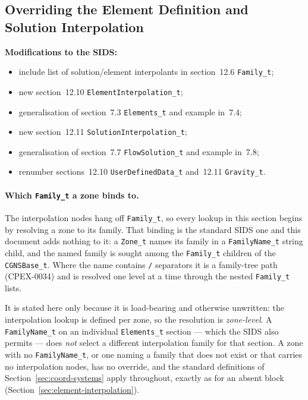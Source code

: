 \documentclass[11pt,letterpaper]{article}
\newenvironment{v2quote}
  {\begin{v2quoteframe}%
   \noindent{\footnotesize\sffamily\bfseries\color{cgnsblue}v2 text}%
   \nopagebreak\par\nopagebreak\vspace{0.15em}}
  {\end{v2quoteframe}}
\newif\ifvfourdraft
\newcommand{\vfourmark}{\ifvfourdraft\textcolor{v4violet}{\textbf{[v4]}}\ \fi}
\begin{document}
\subsection{Overriding the Element Definition and Solution Interpolation}
\label{sec:override}

\begin{v2quote}
\textbf{Modifications to the SIDS:}
\begin{itemize}
  \item include list of solution/element interpolants in section~12.6 \texttt{Family\_t};
  \item new section~12.10 \texttt{ElementInterpolation\_t};
  \item generalisation of section~7.3 \texttt{Elements\_t} and example in~7.4;
  \item new section~12.11 \texttt{SolutionInterpolation\_t};
  \item generalisation of section~7.7 \texttt{FlowSolution\_t} and example in~7.8;
  \item renumber sections~12.10 \texttt{UserDefinedData\_t} and~12.11 \texttt{Gravity\_t}.
\end{itemize}
\end{v2quote}

\paragraph{\vfourmark Which \texttt{Family\_t} a zone binds to.}
The interpolation nodes hang off \texttt{Family\_t}, so every lookup in this
section begins by resolving a zone to its family.  That binding is the standard
SIDS one and this document adds nothing to it: a \texttt{Zone\_t} names its family
in a \texttt{FamilyName\_t} string child, and the named family is sought among the
\texttt{Family\_t} children of the \texttt{CGNSBase\_t}.  Where the name contains
\texttt{/} separators it is a family-tree path (CPEX-0034) and is resolved one
level at a time through the nested \texttt{Family\_t} lists.

It is stated here only because it is load-bearing and otherwise unwritten: the
interpolation lookup is defined per zone, so the resolution is
\emph{zone-level}.  A \texttt{FamilyName\_t} on an individual \texttt{Elements\_t}
section --- which the SIDS also permits --- does \emph{not} select a different
interpolation family for that section.  A zone with no \texttt{FamilyName\_t}, or
one naming a family that does not exist or that carries no interpolation nodes,
has no override, and the standard definitions of
Section~\ref{sec:coord-systems} apply throughout, exactly as for an absent block
(Section~\ref{sec:element-interpolation}).
\end{document}
